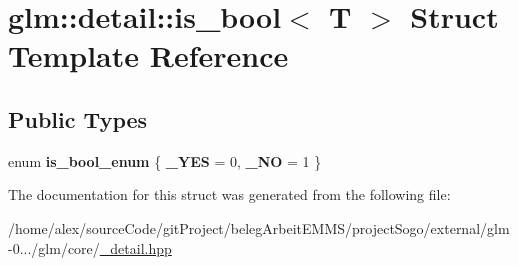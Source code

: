 \hypertarget{structglm_1_1detail_1_1is__bool}{\section{glm\-:\-:detail\-:\-:is\-\_\-bool$<$ T $>$ Struct Template Reference}
\label{structglm_1_1detail_1_1is__bool}
}
\subsection*{Public Types}
\begin{DoxyCompactItemize}
\item 
enum {\bfseries is\-\_\-bool\-\_\-enum} \{ {\bfseries \-\_\-\-Y\-E\-S} = 0, 
{\bfseries \-\_\-\-N\-O} = 1
 \}
\end{DoxyCompactItemize}


The documentation for this struct was generated from the following file\-:\begin{DoxyCompactItemize}
\item 
/home/alex/source\-Code/git\-Project/beleg\-Arbeit\-E\-M\-M\-S/project\-Sogo/external/glm-\/0.../glm/core/\hyperlink{__detail_8hpp}{\-\_\-detail.\-hpp}\end{DoxyCompactItemize}
